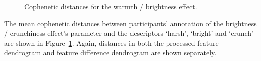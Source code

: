 			\begin{figure}[h!]
				\centering
				\quad
				\caption{Cophenetic distances for the warmth / brightness effect.}
				\label{fig:HarshCophs}
			\end{figure}

			The mean cophenetic distances between participants' annotation of the brightness / crunchiness
			effect's parameter and the descriptors `harsh', `bright' and `crunch' are shown in
			Figure~\ref{fig:HarshCophs}. Again, distances in both the processed feature dendrogram and feature
			difference dendrogram are shown separately.

